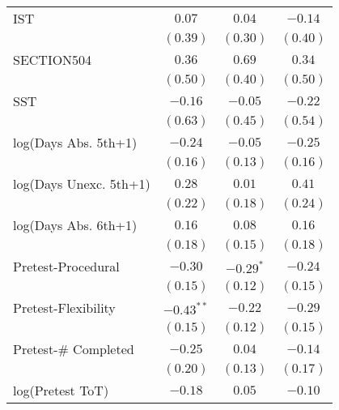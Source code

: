 \begin{center}
\begin{longtable}{l c c c}
IST                                                & $0.07$       & $0.04$       & $-0.14$      \\
                                                   & $(0.39)$     & $(0.30)$     & $(0.40)$     \\
SECTION504                                         & $0.36$       & $0.69$       & $0.34$       \\
                                                   & $(0.50)$     & $(0.40)$     & $(0.50)$     \\
SST                                                & $-0.16$      & $-0.05$      & $-0.22$      \\
                                                   & $(0.63)$     & $(0.45)$     & $(0.54)$     \\
log(Days Abs. 5th+1)                                        & $-0.24$      & $-0.05$      & $-0.25$      \\
                                                   & $(0.16)$     & $(0.13)$     & $(0.16)$     \\
log(Days Unexc. 5th+1)                                     & $0.28$       & $0.01$       & $0.41$       \\
                                                   & $(0.22)$     & $(0.18)$     & $(0.24)$     \\
log(Days Abs. 6th+1)                                        & $0.16$       & $0.08$       & $0.16$       \\
                                                   & $(0.18)$     & $(0.15)$     & $(0.18)$     \\
Pretest-Procedural                                  & $-0.30$      & $-0.29^{*}$  & $-0.24$      \\
                                                   & $(0.15)$     & $(0.12)$     & $(0.15)$     \\
Pretest-Flexibility                                  & $-0.43^{**}$ & $-0.22$      & $-0.29$      \\
                                                   & $(0.15)$     & $(0.12)$     & $(0.15)$     \\
Pretest-\# Completed                           & $-0.25$      & $0.04$       & $-0.14$      \\
                                                   & $(0.20)$     & $(0.13)$     & $(0.17)$     \\
log(Pretest ToT)                         & $-0.18$      & $0.05$       & $-0.10$      \\

\end{longtable}
\end{center}
